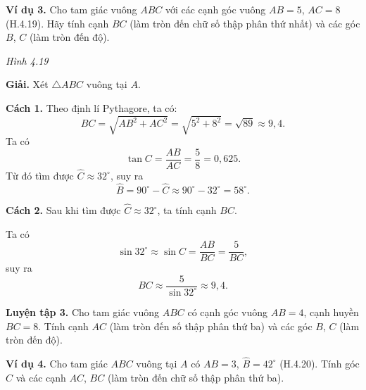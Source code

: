 \begin{lesson}
    \textbf{Ví dụ 3.} Cho tam giác vuông $ABC$ với các cạnh góc vuông $AB=5$, $AC=8$ (H.4.19). Hãy tính cạnh $BC$ (làm tròn đến chữ số thập phân thứ nhất) và các góc $B$, $C$ (làm tròn đến độ).

    \begin{center}

        \textit{Hình 4.19}
    \end{center}

    \textbf{Giải.} Xét $\triangle ABC$ vuông tại $A$.

    \textbf{Cách 1.} Theo định lí Pythagore, ta có:
    \[
        BC=\sqrt{AB^2+AC^2}=\sqrt{5^2+8^2}=\sqrt{89}\approx 9{,}4.
    \]
    Ta có
    \[
        \tan C=\dfrac{AB}{AC}=\dfrac{5}{8}=0{,}625.
    \]
    Từ đó tìm được $\widehat{C}\approx32^\circ$, suy ra
    \[
        \widehat{B}=90^\circ-\widehat{C}\approx90^\circ-32^\circ=58^\circ.
    \]

    \textbf{Cách 2.} Sau khi tìm được $\widehat{C}\approx32^\circ$, ta tính cạnh $BC$.

    Ta có
    \[
        \sin32^\circ\approx\sin C=\dfrac{AB}{BC}=\dfrac{5}{BC},
    \]
    suy ra
    \[
        BC\approx\dfrac{5}{\sin32^\circ}\approx9{,}4.
    \]

    \textbf{Luyện tập 3.} Cho tam giác vuông $ABC$ có cạnh góc vuông $AB=4$, cạnh huyền $BC=8$. Tính cạnh $AC$ (làm tròn đến số thập phân thứ ba) và các góc $B$, $C$ (làm tròn đến độ).

    \answerline
    \answerline
    \answerline

    \textbf{Ví dụ 4.} Cho tam giác $ABC$ vuông tại $A$ có $AB=3$, $\widehat{B}=42^\circ$ (H.4.20). Tính góc $C$ và các cạnh $AC$, $BC$ (làm tròn đến chữ số thập phân thứ ba).

    \begin{center}


\end{center}
\end{lesson}
